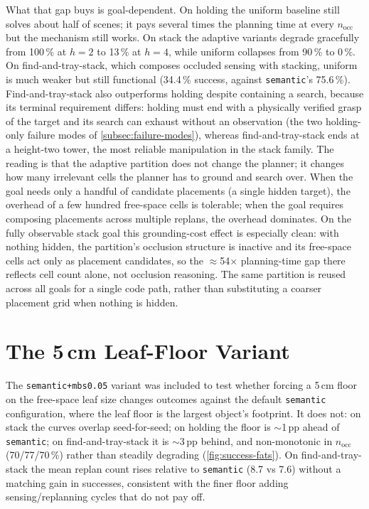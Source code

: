 What that gap buys is goal-dependent. On holding the uniform baseline
still solves about half of scenes; it pays several times the planning
time at every $n_\text{occ}$ but the mechanism still works. On stack the
adaptive variants degrade gracefully from 100\,\% at $h=2$ to 13\,\% at
$h=4$, while uniform collapses from 90\,\% to 0\,\%. On
find-and-tray-stack, which composes occluded sensing with stacking,
uniform is much weaker but still functional (34.4\,\% success, against \texttt{semantic}'s 75.6\,\%). Find-and-tray-stack also outperforms holding despite containing a search, because its terminal requirement differs: holding must end with a physically verified grasp of the target and its search can exhaust without an observation (the two holding-only failure modes of \cref{subsec:failure-modes}), whereas find-and-tray-stack ends at a height-two tower, the most reliable manipulation in the stack family. The reading is that the
adaptive partition does not change the planner; it changes how many
irrelevant cells the planner has to ground and search over. When the goal
needs only a handful of candidate placements (a single hidden target),
the overhead of a few hundred free-space cells is tolerable; when the
goal requires composing placements across multiple replans, the overhead
dominates. On the fully observable stack goal this grounding-cost effect is
especially clean: with nothing hidden, the partition's occlusion structure is
inactive and its free-space cells act only as placement candidates, so the
$\approx$54$\times$ planning-time gap there reflects cell count alone, not
occlusion reasoning. The same partition is reused across all goals for a single
code path, rather than substituting a coarser placement grid when nothing is
hidden.

\section{The 5\,cm Leaf-Floor Variant}
\label{sec:disc-mbs0}

The \texttt{semantic+mbs0.05} variant was included to test whether
forcing a 5\,cm floor on the free-space leaf size changes outcomes
against the default \texttt{semantic} configuration, where the leaf
floor is the largest object's footprint. It does not: on stack the
curves overlap seed-for-seed; on holding the floor is $\sim$1\,pp ahead
of \texttt{semantic}; on find-and-tray-stack it is $\sim$3\,pp behind,
and non-monotonic in $n_\text{occ}$ (70/77/70\,\%) rather than steadily degrading
(\cref{fig:success-fats}). On find-and-tray-stack the mean replan count rises relative to \texttt{semantic} (8.7 vs 7.6) without a matching gain in successes, consistent with the finer floor adding sensing/replanning cycles that do not pay off.

